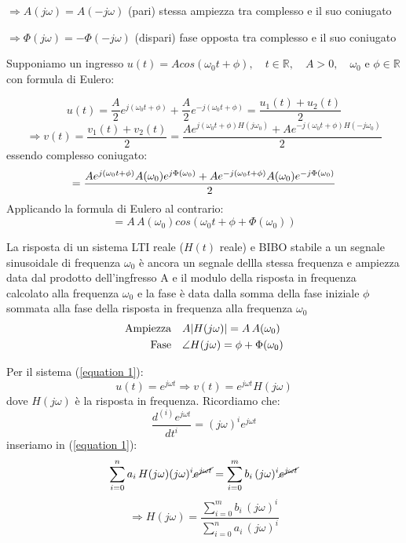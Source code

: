 $ \Rightarrow A(j\omega) =A(-j\omega)$ (pari) stessa ampiezza tra complesso e il suo coniugato

$ \Rightarrow \Phi(j\omega) =-\Phi(-j\omega)$ (dispari) fase opposta tra complesso e il suo coniugato

Supponiamo un ingresso $ u(t)=A cos(\omega_0 t+\phi), \quad t \in \mathbb{R},\quad A>0, \quad \omega_0 \text{ e } \phi \in \mathbb{R} $ con formula di Eulero: %

\begin{equation*}
	u(t)=\frac{A}{2}e^{j(\omega_0 t + \phi)}+\frac{A}{2}e^{-j(\omega_0 t + \phi)} 
		= \frac{u_1(t)+ u_2(t)}{2}
\end{equation*}
\begin{equation*}
	\Rightarrow v(t)=
		\frac{v_1(t)+ v_2(t)}{2}
		= \frac{A e^{j(\omega_0 t + \phi) H(j\omega_0)}+ A e^{-j(\omega_0 t + \phi) H(-j\omega_0)}}{2}
\end{equation*}
		essendo complesso coniugato:
\begin{equation*}
		= \frac{A e^{j(\omega_0 t + \phi)} A(\omega_0) e^{j\Phi(\omega_0)} + A e^{-j(\omega_0 t + \phi)} A(\omega_0) e^{-j\Phi(\omega_0)}}{2}\\ %
\end{equation*}
Applicando la formula di Eulero al contrario:
\begin{equation*}
=A\,A(\omega_0)cos(\omega_0 t+\phi+\Phi(\omega_0))
\end{equation*}

La risposta di un sistema LTI reale ($ H(t) $ reale) e BIBO stabile a un segnale sinusoidale di frequenza $ \omega_0 $ è ancora un segnale dellla stessa frequenza e ampiezza data dal prodotto dell'ingfresso A e il modulo della risposta in frequenza calcolato alla frequenza  $ \omega_0 $ e la fase è data dalla somma della fase iniziale $ \phi $ sommata alla fase della risposta in frequenza alla frequenza  $ \omega_0 $
\begin{equation*}
	\begin{split}
	\text{Ampiezza}\quad & A \lvert H(j\omega)\rvert=A\,A(\omega_0)\\	
	\text{Fase}\quad & \angle H(j\omega) = \phi + \Phi(\omega_0)\\
\end{split}
\end{equation*}

Per il sistema (\ref{equation 1}): 
\[
	u(t)= e^{j\omega t}
	\Rightarrow v(t) = e^{j\omega t} H(j\omega)
\]
dove  $ H(j\omega) $ è la risposta in frequenza. Ricordiamo che:
\[
	\frac{d^{(i)}e^{j\omega t}}{dt^i} = (j\omega)^i e^{j\omega t}
\]
inseriamo in (\ref{equation 1}): 
\[
	\sum_{i=0}^{n}a_i\, H(j\omega)(j\omega)^i \cancel{e^{j\omega t}}
	= \sum_{i=0}^{m}b_i \, (j\omega)^i \cancel{e^{j\omega t}}
\]
\[
	\Rightarrow H(j\omega) = \frac{\sum_{i=0}^{m}b_i \, (j\omega)^i}{\sum_{i=0}^{n}a_i\, (j\omega)^i}
\]

